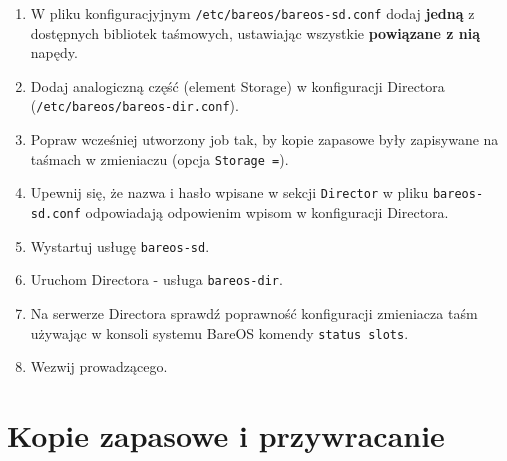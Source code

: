 \documentclass[polish]{article}
\begin{document}
\begin{enumerate}

\item W pliku konfiguracjyjnym \texttt{/etc/bareos/bareos-sd.conf} dodaj \textbf{jedną} z dostępnych bibliotek taśmowych, ustawiając wszystkie \textbf{powiązane z nią} napędy.

\item Dodaj analogiczną część (element Storage) w konfiguracji Directora (\texttt{/etc/bareos/bareos-dir.conf}).

\item Popraw wcześniej utworzony job tak, by kopie zapasowe były zapisywane na taśmach w zmieniaczu (opcja \texttt{Storage =}).

\item Upewnij się, że nazwa i hasło wpisane w sekcji \texttt{Director} w pliku \texttt{bareos-sd.conf} odpowiadają odpowienim wpisom w konfiguracji Directora.

\item Wystartuj usługę \texttt{bareos-sd}.

\item Uruchom Directora - usługa \texttt{bareos-dir}.

\item Na serwerze Directora sprawdź poprawność konfiguracji zmieniacza taśm używając w konsoli systemu BareOS komendy \texttt{status slots}.

\item Wezwij prowadzącego.

\end{enumerate}


\section{Kopie zapasowe i przywracanie}
\end{document}
